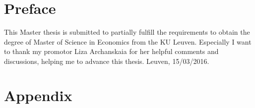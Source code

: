 \documentclass[11pt,leqno,a4paper]{scrbook}
\begin{document}
\setcounter{tocdepth}{1}



\setcounter{equation}{1}
\pagestyle{empty}

\clearpage

\chapter*{Preface\hfill} 

\begin{flushright}
This Master thesis  is submitted to partially fulfill the requirements to obtain the degree of Master of Science in
Economics from the KU Leuven. Especially  I want to thank my promotor Liza Archanskaia for her helpful comments and discussions, helping me to advance this thesis. %
Leuven, 15/03/2016.
\end{flushright}


\mainmatter

\pagestyle{headings}


%






\clearpage
\printbibliography
\vfill
\pagestyle{empty}
\appendix
{}


\tocless \chapter{Appendix}

\clearpage
\newpage
\thispagestyle{empty}

\end{document}
